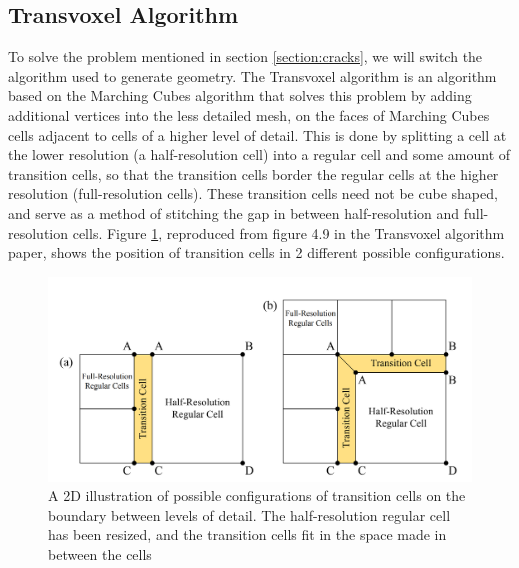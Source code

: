 \documentclass{article}
\begin{document}
\subsection{Transvoxel Algorithm}
To solve the problem mentioned in section \ref{section:cracks}, we will switch the algorithm used to generate geometry. The Transvoxel algorithm \cite{lengyel_2010} is an algorithm based on the Marching Cubes algorithm that solves this problem by adding additional vertices into the less detailed mesh, on the faces of Marching Cubes cells adjacent to cells of a higher level of detail. This is done by splitting a cell at the lower resolution (a half-resolution cell) into a regular cell and some amount of transition cells, so that the transition cells border the regular cells at the higher resolution (full-resolution cells). These transition cells need not be cube shaped, and serve as a method of stitching the gap in between half-resolution and full-resolution cells. Figure \ref{fig:transition_cells}, reproduced from figure 4.9 in the Transvoxel algorithm paper\cite{lengyel_2010}, shows the position of transition cells in 2 different possible configurations.
\begin{figure}[H]
  \includegraphics[width=\textwidth]{transition_cells}
  \caption{A 2D illustration of possible configurations of transition cells on the boundary between levels of detail. The half-resolution regular cell has been resized, and the transition cells fit in the space made in between the cells}
  \label{fig:transition_cells}
\end{figure}
\end{document}
